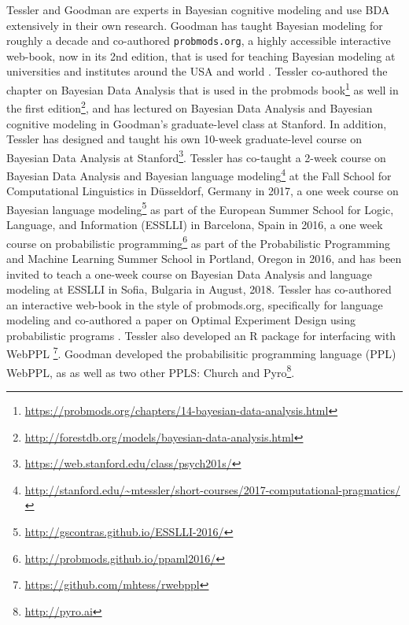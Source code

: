 \documentclass[10pt,letterpaper]{article}
\begin{document}
Tessler and Goodman are experts in Bayesian cognitive modeling and use BDA extensively in their own research. 
Goodman has taught Bayesian modeling for roughly a decade and co-authored \texttt{probmods.org}, a highly accessible interactive web-book, now in its 2nd edition, that is used for teaching Bayesian modeling at universities and institutes around the USA and world \cite{probmods2}. 
Tessler co-authored the chapter on Bayesian Data Analysis that is used in the probmods book\footnote{\url{https://probmods.org/chapters/14-bayesian-data-analysis.html}} as well in the first edition\footnote{\url{http://forestdb.org/models/bayesian-data-analysis.html}}, and has lectured on Bayesian Data Analysis and Bayesian cognitive modeling in Goodman's graduate-level class at Stanford.
In addition, Tessler has designed and taught his own 10-week graduate-level course on Bayesian Data Analysis at Stanford\footnote{
\url{https://web.stanford.edu/class/psych201s/}}.
Tessler has co-taught a 2-week course on Bayesian Data Analysis and Bayesian language modeling\footnote{\url{http://stanford.edu/~mtessler/short-courses/2017-computational-pragmatics/}} at the Fall School for Computational Linguistics in D\"{u}sseldorf, Germany in 2017, a one week course on Bayesian language modeling\footnote{\url{http://gscontras.github.io/ESSLLI-2016/}} as part of the European Summer School for Logic, Language, and Information (ESSLLI) in Barcelona, Spain in 2016, a one week course on probabilistic programming\footnote{\url{http://probmods.github.io/ppaml2016/}} as part of the Probabilistic Programming and Machine Learning Summer School in Portland, Oregon in 2016, and has been invited to teach a one-week course on Bayesian Data Analysis and language modeling at ESSLLI in Sofia, Bulgaria in August, 2018.
Tessler has co-authored an interactive web-book in the style of probmods.org, specifically for language modeling \cite{problang} and co-authored a paper on Optimal Experiment Design using probabilistic programs \cite{ouyangArxivOED}.  
Tessler also developed an R package for interfacing with WebPPL \footnote{\url{https://github.com/mhtess/rwebppl}}.
Goodman developed the probabilisitic programming language (PPL) WebPPL, as as well as two other PPLS: Church \cite{church} and Pyro\footnote{\url{http://pyro.ai}}.




\setlength{\bibleftmargin}{.125in}
\setlength{\bibindent}{-\bibleftmargin}


\end{document}
